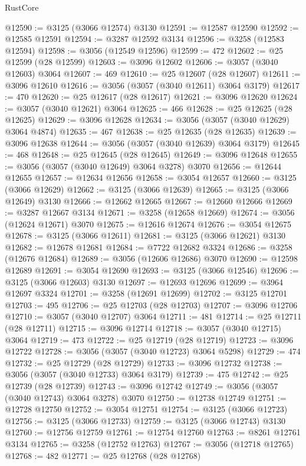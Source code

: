 \begin{lexlean}{RustCore}
\begin{coremodule}
@12590 := @3125 (@3066 @12574) @3130
@12591 := @12587 @12590
@12592 := @12585 @12591
@12594 := @3287 @12592 @3134
@12596 := @3258 (@12583 @12594)
@12598 := @3056 (@12549 @12596)
@12599 := 472
@12602 := @25 @12599 (@28 @12599)
@12603 := @3096 @12602
@12606 := @3057 (@3040 @12603) @3064
@12607 := 469
@12610 := @25 @12607 (@28 @12607)
@12611 := @3096 @12610
@12616 := @3056 (@3057 (@3040 @12611) @3064 @3179)
@12617 := 470
@12620 := @25 @12617 (@28 @12617)
@12621 := @3096 @12620
@12624 := @3057 (@3040 @12621) @3064
@12625 := 466
@12628 := @25 @12625 (@28 @12625)
@12629 := @3096 @12628
@12634 := @3056 (@3057 (@3040 @12629) @3064 @4874)
@12635 := 467
@12638 := @25 @12635 (@28 @12635)
@12639 := @3096 @12638
@12644 := @3056 (@3057 (@3040 @12639) @3064 @3179)
@12645 := 468
@12648 := @25 @12645 (@28 @12645)
@12649 := @3096 @12648
@12655 := @3056 (@3057 (@3040 @12649) @3064 @3278) @3070
@12656 := @12644 @12655
@12657 := @12634 @12656
@12658 := @3054 @12657
@12660 := @3125 (@3066 @12629)
@12662 := @3125 (@3066 @12639)
@12665 := @3125 (@3066 @12649) @3130
@12666 := @12662 @12665
@12667 := @12660 @12666
@12669 := @3287 @12667 @3134
@12671 := @3258 (@12658 @12669)
@12674 := @3056 (@12624 @12671) @3070
@12675 := @12616 @12674
@12676 := @3054 @12675
@12678 := @3125 (@3066 @12611)
@12681 := @3125 (@3066 @12621) @3130
@12682 := @12678 @12681
@12684 := @7722 @12682 @3324
@12686 := @3258 (@12676 @12684)
@12689 := @3056 (@12606 @12686) @3070
@12690 := @12598 @12689
@12691 := @3054 @12690
@12693 := @3125 (@3066 @12546)
@12696 := @3125 (@3066 @12603) @3130
@12697 := @12693 @12696
@12699 := @3964 @12697 @3324
@12701 := @3258 (@12691 @12699)
@12702 := @3125 @12701
@12703 := 495
@12706 := @25 @12703 (@28 @12703)
@12707 := @3096 @12706
@12710 := @3057 (@3040 @12707) @3064
@12711 := 481
@12714 := @25 @12711 (@28 @12711)
@12715 := @3096 @12714
@12718 := @3057 (@3040 @12715) @3064
@12719 := 473
@12722 := @25 @12719 (@28 @12719)
@12723 := @3096 @12722
@12728 := @3056 (@3057 (@3040 @12723) @3064 @5298)
@12729 := 474
@12732 := @25 @12729 (@28 @12729)
@12733 := @3096 @12732
@12738 := @3056 (@3057 (@3040 @12733) @3064 @3179)
@12739 := 475
@12742 := @25 @12739 (@28 @12739)
@12743 := @3096 @12742
@12749 := @3056 (@3057 (@3040 @12743) @3064 @3278) @3070
@12750 := @12738 @12749
@12751 := @12728 @12750
@12752 := @3054 @12751
@12754 := @3125 (@3066 @12723)
@12756 := @3125 (@3066 @12733)
@12759 := @3125 (@3066 @12743) @3130
@12760 := @12756 @12759
@12761 := @12754 @12760
@12763 := @8261 @12761 @3134
@12765 := @3258 (@12752 @12763)
@12767 := @3056 (@12718 @12765)
@12768 := 482
@12771 := @25 @12768 (@28 @12768)

\end{coremodule}
\end{lexlean}
